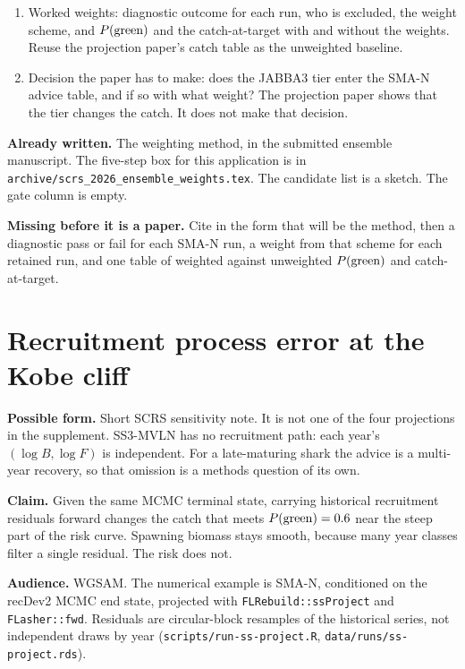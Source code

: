 \documentclass[11pt,a4paper]{article}
\begin{document}
\begin{enumerate}[leftmargin=*]
    same \texttt{do\_recdev} as MVLN), FLasher process error as a sensitivity,
    the JABBA3 bridge, and the WG JAGS runs if they are ported. The JAGS 1-B
    and 1-S results from an older knit are not relabelled as JABBA3.
  \item Worked weights: diagnostic outcome for each run, who is excluded, the
    weight scheme, and $P(\mathrm{green})$ and the catch-at-target with and without the
    weights. Reuse the projection paper's catch table as the unweighted
    baseline.
  \item Decision the paper has to make: does the JABBA3 tier enter the SMA-N
    advice table, and if so with what weight? The projection paper shows that
    the tier changes the catch. It does not make that decision.
\end{enumerate}

\textbf{Already written.} The weighting method, in the submitted ensemble
manuscript. The five-step box for this application is in
\texttt{archive/scrs\_2026\_ensemble\_weights.tex}. The candidate list is a
sketch. The gate column is empty.

\textbf{Missing before it is a paper.} Cite \citet{WangEnsembleR5} in the
form that will be the method, then a diagnostic pass or fail for each SMA-N
run, a weight from that scheme for each retained run, and one table of
weighted against unweighted $P(\mathrm{green})$ and catch-at-target.

\section{Recruitment process error at the Kobe cliff}

\textbf{Possible form.} Short SCRS sensitivity note. It is not one of the
four projections in the supplement. SS3-MVLN has no recruitment path: each
year's $(\log B, \log F)$ is independent. For a late-maturing shark the
advice is a multi-year recovery, so that omission is a methods question of
its own.

\textbf{Claim.} Given the same MCMC terminal state, carrying historical
recruitment residuals forward changes the catch that meets $P(\mathrm{green}) = 0.6$ near
the steep part of the risk curve. Spawning biomass stays smooth, because many
year classes filter a single residual. The risk does not.

\textbf{Audience.} WGSAM. The numerical example is SMA-N, conditioned on the
recDev2 MCMC end state, projected with \texttt{FLRebuild::ssProject} and
\texttt{FLasher::fwd}. Residuals are circular-block resamples of the
historical series, not independent draws by year
(\texttt{scripts/run-ss-project.R}, \texttt{data/runs/ss-project.rds}).
\end{document}
